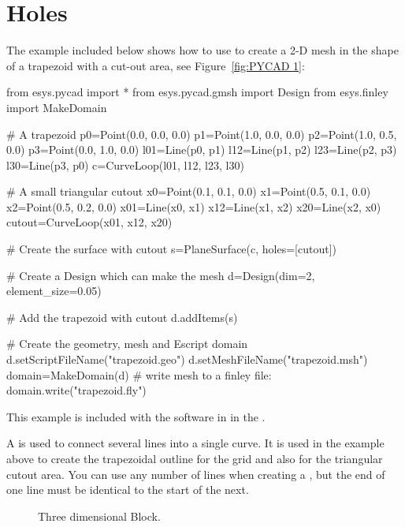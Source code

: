 \section{Holes}
The example included below shows how to use \pycad to create a 2-D mesh
in the shape of a trapezoid with a cut-out area, see  Figure~\ref{fig:PYCAD 1}:
\begin{python}
from esys.pycad import *
from esys.pycad.gmsh import Design
from esys.finley import MakeDomain

# A trapezoid
p0=Point(0.0, 0.0, 0.0)
p1=Point(1.0, 0.0, 0.0)
p2=Point(1.0, 0.5, 0.0)
p3=Point(0.0, 1.0, 0.0)
l01=Line(p0, p1)
l12=Line(p1, p2)
l23=Line(p2, p3)
l30=Line(p3, p0)
c=CurveLoop(l01, l12, l23, l30)

# A small triangular cutout
x0=Point(0.1, 0.1, 0.0)
x1=Point(0.5, 0.1, 0.0)
x2=Point(0.5, 0.2, 0.0)
x01=Line(x0, x1)
x12=Line(x1, x2)
x20=Line(x2, x0)
cutout=CurveLoop(x01, x12, x20)

# Create the surface with cutout
s=PlaneSurface(c, holes=[cutout])

# Create a Design which can make the mesh
d=Design(dim=2, element_size=0.05)

# Add the trapezoid with cutout
d.addItems(s)

# Create the geometry, mesh and Escript domain
d.setScriptFileName("trapezoid.geo")
d.setMeshFileName("trapezoid.msh")
domain=MakeDomain(d)
# write mesh to a finley file:
domain.write("trapezoid.fly")
\end{python}
This example is included with the software in
 in the \ExampleDirectory.

A  is used to connect several lines into a single curve.
It is used in the example above to create the trapezoidal outline for the grid
and also for the triangular cutout area.
You can use any number of lines when creating a , but
the end of one line must be identical to the start of the next.


\begin{figure}
\caption{Three dimensional Block.}
\label{fig:PYCAD 2}
\end{figure}

